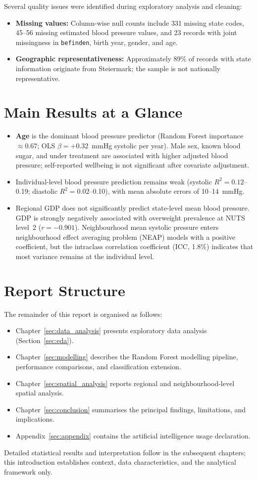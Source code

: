 Several quality issues were identified during exploratory analysis and cleaning:
\begin{itemize}
    \item \textbf{Missing values:} Column-wise null counts include 331 missing state codes, 45--56 missing estimated blood pressure values, and 23 records with joint missingness in \texttt{befinden}, birth year, gender, and age.
    \item \textbf{Geographic representativeness:} Approximately 89\% of records with state information originate from Steiermark; the sample is not nationally representative.
\end{itemize}

\section{Main Results at a Glance}
\label{sec:results_preview}

\begin{itemize}
    \item \textbf{Age} is the dominant blood pressure predictor (Random Forest importance $\approx 0.67$; OLS $\beta = +0.32$~mmHg systolic per year). Male sex, known blood sugar, and under treatment are associated with higher adjusted blood pressure; self-reported wellbeing is not significant after covariate adjustment.
    \item Individual-level blood pressure prediction remains weak (systolic $R^2 = 0.12$--0.19; diastolic $R^2 = 0.02$--0.10), with mean absolute errors of 10--14~mmHg.
    \item Regional GDP does not significantly predict state-level mean blood pressure. GDP is strongly negatively associated with overweight prevalence at NUTS level~2 ($r = -0.901$). Neighbourhood mean systolic pressure enters neighbourhood effect averaging problem (NEAP) models with a positive coefficient, but the intraclass correlation coefficient (ICC, 1.8\%) indicates that most variance remains at the individual level.
\end{itemize}

\section{Report Structure}
\label{sec:report_structure}

The remainder of this report is organised as follows:
\begin{itemize}
    \item Chapter~\ref{sec:data_analysis} presents exploratory data analysis (Section~\ref{sec:eda}).
    \item Chapter~\ref{sec:modelling} describes the Random Forest modelling pipeline, performance comparisons, and classification extension.
    \item Chapter~\ref{sec:spatial_analysis} reports regional and neighbourhood-level spatial analysis.
    \item Chapter~\ref{sec:conclusion} summarises the principal findings, limitations, and implications.
    \item Appendix~\ref{sec:appendix} contains the artificial intelligence usage declaration.
\end{itemize}

Detailed statistical results and interpretation follow in the subsequent chapters; this introduction establishes context, data characteristics, and the analytical framework only.
